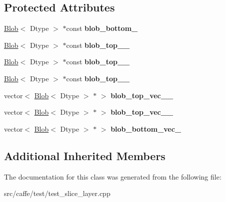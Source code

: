\subsection*{Protected Attributes}
\begin{DoxyCompactItemize}
\item 
\mbox{\label{classcaffe_1_1_slice_layer_test_a284b87e3b4a21eb7d96f699c88b96893}} 
\mbox{\hyperlink{classcaffe_1_1_blob}{Blob}}$<$ Dtype $>$ $\ast$const {\bfseries blob\+\_\+bottom\+\_\+}
\item 
\mbox{\label{classcaffe_1_1_slice_layer_test_ad8635a35ad0854902ee890386d37f300}} 
\mbox{\hyperlink{classcaffe_1_1_blob}{Blob}}$<$ Dtype $>$ $\ast$const {\bfseries blob\+\_\+top\+\_\+\_\+}
\item 
\mbox{\label{classcaffe_1_1_slice_layer_test_a7a32841eb22514052aeecc57547255c8}} 
\mbox{\hyperlink{classcaffe_1_1_blob}{Blob}}$<$ Dtype $>$ $\ast$const {\bfseries blob\+\_\+top\+\_\+\_\+}
\item 
\mbox{\label{classcaffe_1_1_slice_layer_test_a8b278acf48ea6583a148eedb1e9fa285}} 
\mbox{\hyperlink{classcaffe_1_1_blob}{Blob}}$<$ Dtype $>$ $\ast$const {\bfseries blob\+\_\+top\+\_\+\_\+}
\item 
\mbox{\label{classcaffe_1_1_slice_layer_test_ac6dd09aa81cf532b975161a62d9f4806}} 
vector$<$ \mbox{\hyperlink{classcaffe_1_1_blob}{Blob}}$<$ Dtype $>$ $\ast$ $>$ {\bfseries blob\+\_\+top\+\_\+vec\+\_\+\_\+}
\item 
\mbox{\label{classcaffe_1_1_slice_layer_test_adce085e2e9f58ee3cf1b22a8d65c0435}} 
vector$<$ \mbox{\hyperlink{classcaffe_1_1_blob}{Blob}}$<$ Dtype $>$ $\ast$ $>$ {\bfseries blob\+\_\+top\+\_\+vec\+\_\+\_\+}
\item 
\mbox{\label{classcaffe_1_1_slice_layer_test_a2ed8c1f2d9a716cf4efe375c57136713}} 
vector$<$ \mbox{\hyperlink{classcaffe_1_1_blob}{Blob}}$<$ Dtype $>$ $\ast$ $>$ {\bfseries blob\+\_\+bottom\+\_\+vec\+\_\+}
\end{DoxyCompactItemize}
\subsection*{Additional Inherited Members}


The documentation for this class was generated from the following file\+:\begin{DoxyCompactItemize}
\item 
src/caffe/test/test\+\_\+slice\+\_\+layer.\+cpp\end{DoxyCompactItemize}
